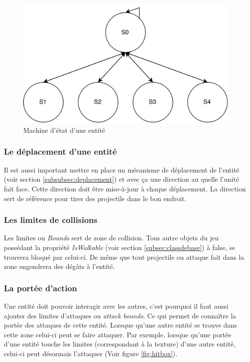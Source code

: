 \documentclass[11pt, a4paper, oneside]{report}
\begin{document}
\begin{figure}[h]
	\begin{center}
	\includegraphics[width=.6\textwidth]{StatesEntity}
	\caption{Machine d'état d'une entité}
	\label{fig:StatesEntity}
	\end{center}
\end{figure}

\subsubsection{Le déplacement d'une entité}
Il est aussi important mettre en place un mécanisme de déplacement de l'entité (voir section \ref{subsubsec:deplacement}) et avec ça une direction au quelle l'unité fait face. Cette direction doit être mise-à-jour à chaque déplacement. La direction sert de référence pour tirer des projectile dans le bon endroit.

\subsubsection{Les limites de collisions}
Les limites ou \textit{Bounds} sert de zone de collision. Tous autre objets du jeu possédant la propriété \textit{IsWalkable} (voir section \ref{subsec:classdebase}) à false, se trouvera bloqué par celui-ci. De même que tout projectile ou attaque fait dans la zone engendrera des dégâts à l'entité.

\subsubsection{La portée d'action}
Une entité doit pouvoir interagir avec les autres, c'est pourquoi il faut aussi ajouter des limites d'attaques ou \textit{attack bounds}. Ce qui permet de connaître la portée des attaques de cette entité. Lorsque qu'une autre entité se trouve dans cette zone celui-ci peut se faire attaquer. Par exemple, lorsque qu'une portée d'une entité touche les limites (correspondant à la texture) d'une autre entité, celui-ci peut désormais l'attaquer (Voir figure \ref{fig:hitbox}).
\end{document}

